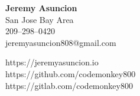 \documentclass[10pt, oneside]{letter}
\begin{document}
  \begin{minipage}[t]{11cm}
    \flushleft
    \textbf{Jeremy Asuncion} \\
    San Jose Bay Area \\
    209--298--0420 \\
    jeremyasuncion808@gmail.com \\
  \end{minipage}
  \begin{minipage}[t]{7cm}
    \flushright
    https://jeremyasuncion.io \\
    https://github.com/codemonkey800 \\
    https://gitlab.com/codemonkey800 \\
  \end{minipage}

  \vspace{0.1in}
\end{document}
